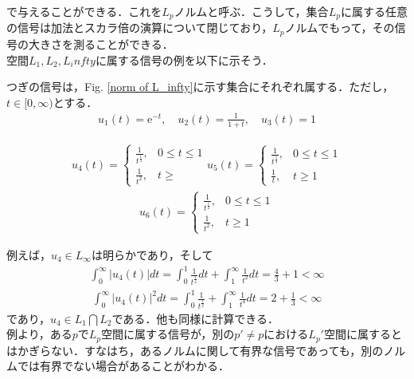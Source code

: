 \documentclass[a4paper,11pt,uplatex]{jsarticle} %
\theoremstyle{definition}	%
\newcommand{\figref}[1]{Fig. \ref{#1}}
\begin{document}
で与えることができる．これを$L_p$ノルムと呼ぶ．こうして，集合$L_p$に属する任意の信号は加法とスカラ倍の演算について閉じており，$L_p$ノルムでもって，その信号の大きさを測ることができる．\\
空間$L_1,L_2,L_infty$に属する信号の例を以下に示そう．
\begin{tcolorbox}[title=例5.2,
drop small lifted shadow=black]
つぎの信号は，\figref{norm of L_infty}に示す集合にそれぞれ属する．ただし，$t \in [0,\infty)$とする．
\begin{align*}
u_1 (t) = \textrm{e}^{-t}, \quad u_2(t) = \frac{1}{1 + t}, \quad u_3(t) = 1
\end{align*}

\begin{align*}
u_4 (t) = 
\begin{cases}
    \frac{1}{t^{\frac{1}{4}}},  &0 \leq t \leq 1\\
    \frac{1}{t^2},              &t \geq  
\end{cases}
u_5 (t) =
\begin{cases}
    \frac{1}{t^{\frac{1}{4}}},  & 0 \leq t \leq 1\\
    \frac{1}{t},                & t \geq 1
\end{cases}
\end{align*}
\begin{align*}
u_6(t) =
\begin{cases}
    \frac{1}{t^\frac{1}{2}},    & 0 \leq t \leq 1\\
    \frac{1}{t^2},              & t \geq 1
\end{cases}
\end{align*}



例えば，$u_4 \in L_\infty $は明らかであり，そして
\begin{align*}
\int_0^\infty | u_4 (t) | dt = \int_0^1 \frac{1}{t^\frac{1}{4}} dt + \int_1^\infty \frac{1}{t^2} dt = \frac{4}{3} + 1 < \infty
\end{align*}
\begin{align*}
\int_0^\infty | u_4 (t) |^2 dt = \int_0^1 \frac{1}{t^\frac{1}{2}} + \int_1^\infty \frac{1}{t^4} dt = 2 + \frac{1}{3} < \infty
\end{align*}
であり，$u_4 \in L_1 \bigcap L_2$である．他も同様に計算できる．\\
例より，ある$p$で$L_p$空間に属する信号が，別の$p' \neq p $における$L_p'$空間に属するとはかぎらない．すなはち，あるノルムに関して有界な信号であっても，別のノルムでは有界でない場合があることがわかる．
\end{tcolorbox}
\end{document}
